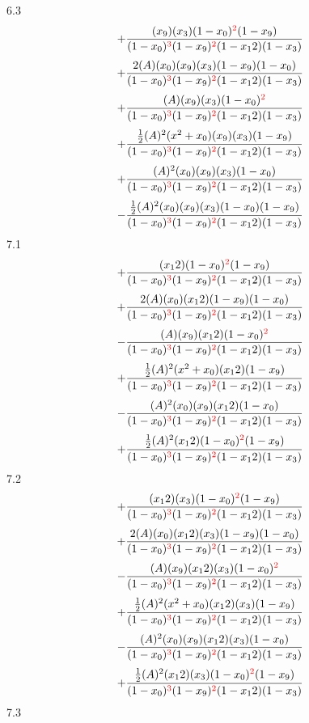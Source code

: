 \documentclass{article}
\begin{document}
6.3
\[+\frac{(x_9)(x_3)(1-x_0)^{\textcolor{red}{2}}(1-x_9)}{(1-x_0)^{\textcolor{red}{3}}(1-x_9)^{\textcolor{red}{2}}(1-x_12)(1-x_3)}\]\[+\frac{2(A)(x_0)(x_9)(x_3)(1-x_9)(1-x_0)}{(1-x_0)^{\textcolor{red}{3}}(1-x_9)^{\textcolor{red}{2}}(1-x_12)(1-x_3)}\]\[+\frac{(A)(x_9)(x_3)(1-x_0)^{\textcolor{red}{2}}}{(1-x_0)^{\textcolor{red}{3}}(1-x_9)^{\textcolor{red}{2}}(1-x_12)(1-x_3)}\]\[+\frac{\frac{1}{2}(A)^{2}(x^{2}+x_0)(x_9)(x_3)(1-x_9)}{(1-x_0)^{\textcolor{red}{3}}(1-x_9)^{\textcolor{red}{2}}(1-x_12)(1-x_3)}\]\[+\frac{(A)^{2}(x_0)(x_9)(x_3)(1-x_0)}{(1-x_0)^{\textcolor{red}{3}}(1-x_9)^{\textcolor{red}{2}}(1-x_12)(1-x_3)}\]\[-\frac{\frac{1}{2}(A)^{2}(x_0)(x_9)(x_3)(1-x_0)(1-x_9)}{(1-x_0)^{\textcolor{red}{3}}(1-x_9)^{\textcolor{red}{2}}(1-x_12)(1-x_3)}\]
7.1
\[+\frac{(x_12)(1-x_0)^{\textcolor{red}{2}}(1-x_9)}{(1-x_0)^{\textcolor{red}{3}}(1-x_9)^{\textcolor{red}{2}}(1-x_12)(1-x_3)}\]\[+\frac{2(A)(x_0)(x_12)(1-x_9)(1-x_0)}{(1-x_0)^{\textcolor{red}{3}}(1-x_9)^{\textcolor{red}{2}}(1-x_12)(1-x_3)}\]\[-\frac{(A)(x_9)(x_12)(1-x_0)^{\textcolor{red}{2}}}{(1-x_0)^{\textcolor{red}{3}}(1-x_9)^{\textcolor{red}{2}}(1-x_12)(1-x_3)}\]\[+\frac{\frac{1}{2}(A)^{2}(x^{2}+x_0)(x_12)(1-x_9)}{(1-x_0)^{\textcolor{red}{3}}(1-x_9)^{\textcolor{red}{2}}(1-x_12)(1-x_3)}\]\[-\frac{(A)^{2}(x_0)(x_9)(x_12)(1-x_0)}{(1-x_0)^{\textcolor{red}{3}}(1-x_9)^{\textcolor{red}{2}}(1-x_12)(1-x_3)}\]\[+\frac{\frac{1}{2}(A)^{2}(x_12)(1-x_0)^{\textcolor{red}{2}}(1-x_9)}{(1-x_0)^{\textcolor{red}{3}}(1-x_9)^{\textcolor{red}{2}}(1-x_12)(1-x_3)}\]
7.2
\[+\frac{(x_12)(x_3)(1-x_0)^{\textcolor{red}{2}}(1-x_9)}{(1-x_0)^{\textcolor{red}{3}}(1-x_9)^{\textcolor{red}{2}}(1-x_12)(1-x_3)}\]\[+\frac{2(A)(x_0)(x_12)(x_3)(1-x_9)(1-x_0)}{(1-x_0)^{\textcolor{red}{3}}(1-x_9)^{\textcolor{red}{2}}(1-x_12)(1-x_3)}\]\[-\frac{(A)(x_9)(x_12)(x_3)(1-x_0)^{\textcolor{red}{2}}}{(1-x_0)^{\textcolor{red}{3}}(1-x_9)^{\textcolor{red}{2}}(1-x_12)(1-x_3)}\]\[+\frac{\frac{1}{2}(A)^{2}(x^{2}+x_0)(x_12)(x_3)(1-x_9)}{(1-x_0)^{\textcolor{red}{3}}(1-x_9)^{\textcolor{red}{2}}(1-x_12)(1-x_3)}\]\[-\frac{(A)^{2}(x_0)(x_9)(x_12)(x_3)(1-x_0)}{(1-x_0)^{\textcolor{red}{3}}(1-x_9)^{\textcolor{red}{2}}(1-x_12)(1-x_3)}\]\[+\frac{\frac{1}{2}(A)^{2}(x_12)(x_3)(1-x_0)^{\textcolor{red}{2}}(1-x_9)}{(1-x_0)^{\textcolor{red}{3}}(1-x_9)^{\textcolor{red}{2}}(1-x_12)(1-x_3)}\]
7.3
\end{document}
